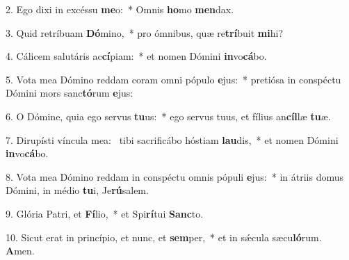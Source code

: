2. Ego dixi in excéssu \textbf{me}o:~*  Omnis \textbf{ho}mo \textbf{men}dax.\

3. Quid retríbuam \textbf{Dó}mino,~*  pro ómnibus, quæ re\textbf{trí}buit \textbf{mi}hi?\

4. Cálicem salutáris ac\textbf{cí}piam:~*  et nomen Dómini \textbf{in}vo\textbf{cá}bo.\

5. Vota mea Dómino reddam coram omni pópulo \textbf{e}jus:~*  pretiósa in conspéctu Dómini mors sanc\textbf{tó}rum \textbf{e}jus:\

6. O Dómine, quia ego servus \textbf{tu}us:~*  ego servus tuus, et fílius an\textbf{cíl}læ \textbf{tu}æ.\

7. Dirupísti víncula mea: \dag\  tibi sacrificábo hóstiam \textbf{lau}dis,~*  et nomen Dómini \textbf{in}vo\textbf{cá}bo.\

8. Vota mea Dómino reddam in conspéctu omnis pópuli \textbf{e}jus:~*  in átriis domus Dómini, in médio \textbf{tu}i, Je\textbf{rú}salem.\

9. Glória Patri, et \textbf{Fí}lio,~*  et Spi\textbf{rí}tui \textbf{Sanc}to.\

10. Sicut erat in princípio, et nunc, et \textbf{sem}per,~*  et in sǽcula sæcu\textbf{ló}rum. \textbf{A}men.\

